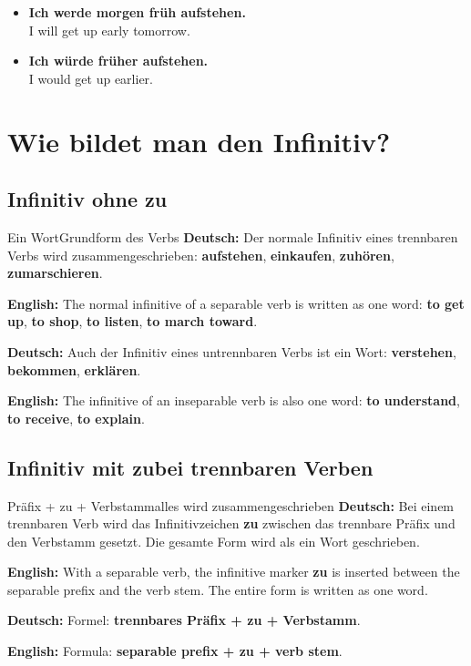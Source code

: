 \documentclass[a4paper,11pt]{article}
\newcommand{\GermanText}[1]{\textbf{Deutsch: }#1\par}
\newcommand{\EnglishText}[1]{{\small\color{SoftGray}\textbf{English: }#1\par}}
\newcommand{\ExampleItem}[2]{\item \textbf{#1}\\{\small\color{SoftGray}#2}}
\begin{document}
        \begin{exbox}
            \begin{itemize}
                \ExampleItem{Ich werde morgen früh aufstehen.}{I will get up early tomorrow.}
                \ExampleItem{Ich würde früher aufstehen.}{I would get up earlier.}
            \end{itemize}
        \end{exbox}


    \section{Wie bildet man den Infinitiv?}

        \subsection{Infinitiv ohne \glqq zu\grqq}

        \begin{grammarentry}{Ein Wort}{Grundform des Verbs}
            \GermanText{Der normale Infinitiv eines trennbaren Verbs wird zusammengeschrieben: \textbf{aufstehen}, \textbf{einkaufen}, \textbf{zuhören}, \textbf{zumarschieren}.}
            \EnglishText{The normal infinitive of a separable verb is written as one word: \textbf{to get up}, \textbf{to shop}, \textbf{to listen}, \textbf{to march toward}.}

            \GermanText{Auch der Infinitiv eines untrennbaren Verbs ist ein Wort: \textbf{verstehen}, \textbf{bekommen}, \textbf{erklären}.}
            \EnglishText{The infinitive of an inseparable verb is also one word: \textbf{to understand}, \textbf{to receive}, \textbf{to explain}.}
        \end{grammarentry}

        \subsection{Infinitiv mit \glqq zu\grqq bei trennbaren Verben}

        \begin{grammarentry}{Präfix + zu + Verbstamm}{alles wird zusammengeschrieben}
            \GermanText{Bei einem trennbaren Verb wird das Infinitivzeichen \textbf{zu} zwischen das trennbare Präfix und den Verbstamm gesetzt. Die gesamte Form wird als ein Wort geschrieben.}
            \EnglishText{With a separable verb, the infinitive marker \textbf{zu} is inserted between the separable prefix and the verb stem. The entire form is written as one word.}

            \GermanText{Formel: \textbf{trennbares Präfix + zu + Verbstamm}.}
            \EnglishText{Formula: \textbf{separable prefix + zu + verb stem}.}
        \end{grammarentry}
\end{document}

